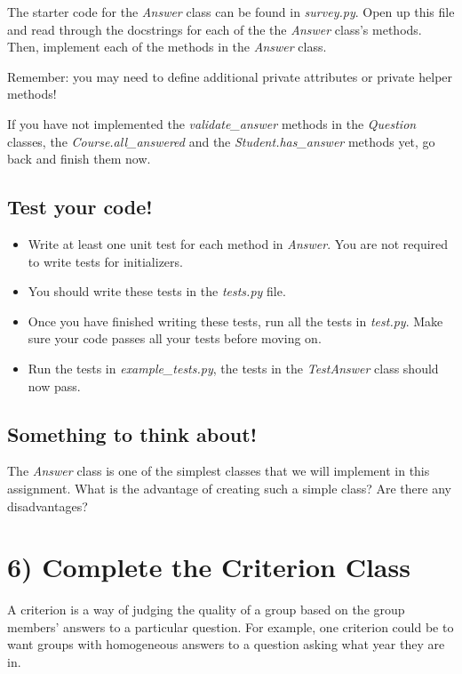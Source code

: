 \documentclass[12pt]{article}
\begin{document}
\bigskip

\noindent The starter code for the \textit{Answer} class can be found in \textit{survey.py}.
Open up this file and read through the docstrings for each of the the \textit{Answer}
class’s methods. Then, implement each of the methods in the \textit{Answer} class.

\bigskip

\noindent Remember: you may need to define additional private attributes or
private helper methods!

\bigskip

If you have not implemented the \textit{validate\_answer} methods in the \textit{Question}
classes, the \textit{Course.all\_answered} and the \textit{Student.has\_answer}
methods yet, go back and finish them now.

\bigskip

\subsection*{Test your code!}
\begin{itemize}
    \item Write at least one unit test for each method in \textit{Answer}. You are not required to write tests for initializers.
    \item You should write these tests in the \textit{tests.py} file.
    \item Once you have finished writing these tests, run all the tests in
    \textit{test.py}. Make sure your code passes all your tests before moving on.
    \item Run the tests in \textit{example\_tests.py}, the tests in the \textit{TestAnswer}
    class should now pass.
\end{itemize}

\subsection*{Something to think about!}
The \textit{Answer} class is one of the simplest classes that we will implement
in this assignment. What is the advantage of creating such a simple class? Are
there any disadvantages?

\section*{6) Complete the Criterion Class}
A criterion is a way of judging the quality of a group based on the group members’
answers to a particular question. For example, one criterion could be to want
groups with homogeneous answers to a question asking what year they are in.
\end{document}
